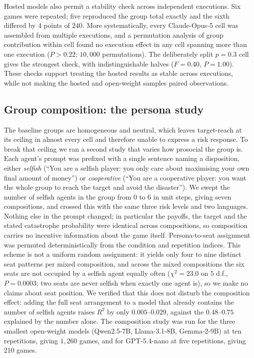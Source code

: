 \documentclass[openacc]{rsproca_new}
\begin{document}
Hosted models also permit a stability check across independent executions. Six games were repeated; five reproduced the group total exactly and the sixth differed by $4$ points of $240$. More systematically, every Claude-Opus-5 cell was assembled from multiple executions, and a permutation analysis of group contribution within cell found no execution effect in any cell spanning more than one execution ($P>0.22$; $10{,}000$ permutations). The deliberately split $p=0.3$ cell gives the strongest check, with indistinguishable halves ($F=0.40$, $P=1.00$). These checks support treating the hosted results as stable across executions, while not making the hosted and open-weight samples paired observations.

\subsection{Group composition: the persona study}
\label{sec:personamethods}
The baseline groups are homogeneous and neutral, which leaves target-reach at its ceiling in almost every cell and therefore unable to express a risk response. To break that ceiling we ran a second study that varies how prosocial the group is. Each agent's prompt was prefixed with a single sentence naming a disposition, either \emph{selfish} (``You are a selfish player: you only care about maximising your own final amount of money'') or \emph{cooperative} (``You are a cooperative player: you want the whole group to reach the target and avoid the disaster''). We swept the number of selfish agents in the group from $0$ to $6$ in unit steps, giving seven compositions, and crossed this with the same three risk levels and two languages. Nothing else in the prompt changed; in particular the payoffs, the target and the stated catastrophe probability were identical across compositions, so composition carries no incentive information about the game itself. Persona-to-seat assignment was permuted deterministically from the condition and repetition indices. This scheme is not a uniform random assignment: it yields only four to nine distinct seat patterns per mixed composition, and across the mixed compositions the six seats are not occupied by a selfish agent equally often ($\chi^2=23.0$ on $5$ d.f., $P=0.0003$; two seats are never selfish when exactly one agent is), so we make no claims about seat position. We verified that this does not disturb the composition effect: adding the full seat arrangement to a model that already contains the number of selfish agents raises $R^2$ by only $0.005$--$0.029$, against the $0.48$--$0.75$ explained by the number alone. The composition study was run for the three smallest open-weight models (Qwen2.5-7B, Llama-3.1-8B, Gemma-2-9B) at ten repetitions, giving $1{,}260$ games, and for GPT-5.4-nano at five repetitions, giving $210$ games.
\end{document}
